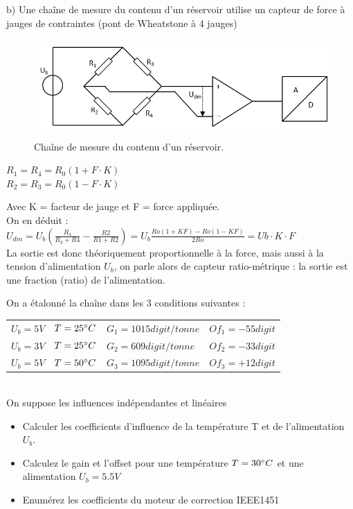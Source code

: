 b)	Une chaîne de mesure du contenu d'un réservoir utilise un capteur de force à jauges de contraintes (pont de Wheatstone à 4 jauges)

\begin{figure}[h!]
\centering
\includegraphics[height=3.7cm]{assets/figures/Exercice_3_5_c.PNG}
\caption{Chaîne de mesure du contenu d'un réservoir.}
\label{fig:Exercice_3_5_c}
\end{figure}

\begin{center}
$R_1 = R_4 = R_0(1 + F \cdot K)$\\
$R_2 = R_3 = R_0(1 - F \cdot K)$\\
\end{center}

Avec K = facteur de jauge et F = force appliquée.\\

On en déduit :	$U_{dm} = U_b ( \frac{ R_4}{R_3+R4} - \frac{R2}{R1+R2} ) = U_b \frac{ Ro(1+KF) -Ro(1-KF)}{2Ro}  = Ub \cdot K \cdot F$ \\
La sortie est donc théoriquement proportionnelle à la force, mais aussi à la tension d'alimentation $U_b$, on parle alors de capteur ratio-métrique : la sortie est une fraction (ratio) de l'alimentation.

On a étalonné la chaîne dans les 3 conditions suivantes :\\

\begin {center}
\begin{tabular}{llll}
$U_b = 5V$ &	$T=25 \degree C$ &	$G_1 = 1015 digit/tonne$ &	$Of_1 = -55 digit$\\
$U_b = 3V$ &	$T=25 \degree C$ &	$G_2 = 609 digit/tonne$ &	$Of_2 = -33 digit$\\
$U_b = 5V$ &	$T=50 \degree C$ &	$G_3 = 1095 digit/tonne$ &	$Of_3 = +12 digit$\\
\end{tabular}
\end{center}
~\\
On suppose les influences indépendantes et linéaires

\begin{itemize}
\item Calculer les coefficients d'influence de la température T et de l'alimentation $U_b$.
\item Calculez le gain et l'offset pour une température $T=30 \degree C$ et une alimentation $U_b=5.5V$
\item Enumérez les coefficients du moteur de correction IEEE1451
\end{itemize}

